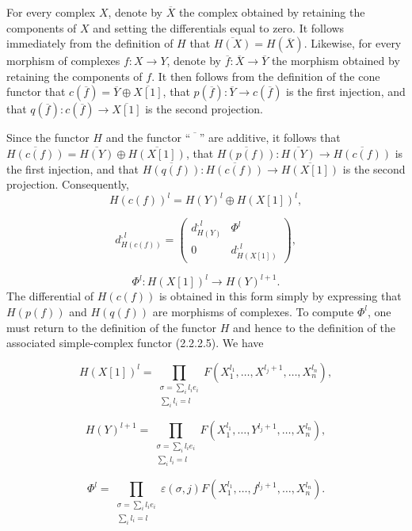 \clearpage
{}%
\begingroup
\small
\setlength{\abovedisplayskip}{3pt plus 2pt minus 2pt}%
\setlength{\belowdisplayskip}{3pt plus 2pt minus 2pt}%
\setlength{\jot}{2pt}%

For every complex $X$, denote by $\overline{X}$ the complex obtained by
retaining the components of $X$ and setting the differentials equal to zero.
It follows immediately from the definition of $H$ that
$\overline{H(X)}=H(\overline{X})$. Likewise, for every morphism of complexes
$f\colon X\longrightarrow Y$, denote by
$\overline{f}\colon\overline{X}\longrightarrow\overline{Y}$ the morphism
obtained by retaining the components of $f$. It then follows from the
definition of the cone functor that
$c(\overline{f})=\overline{Y}\oplus\overline{X[1]}$, that
$p(\overline{f})\colon\overline{Y}\longrightarrow c(\overline{f})$ is the
first injection, and that
$q(\overline{f})\colon c(\overline{f})\longrightarrow\overline{X[1]}$ is the
second projection.

Since the functor $H$ and the functor ``$\overline{\phantom{X}}$'' are
additive, it follows that
$\overline{H(c(f))}=\overline{H(Y)}\oplus\overline{H(X[1])}$, that
$\overline{H(p(f))}\colon\overline{H(Y)}\longrightarrow\overline{H(c(f))}$ is
the first injection, and that
$\overline{H(q(f))}\colon\overline{H(c(f))}\longrightarrow\overline{H(X[1])}$
is the second projection. Consequently,
\[
  H(c(f))^l=H(Y)^l\oplus H(X[1])^l,
\]

\begin{equation}
  d_{H(c(f))}^{,l}=
  \begin{pmatrix}
    d_{H(Y)}^{,l} & \Phi^l\\
    0 & d_{H(X[1])}^{,l}
  \end{pmatrix},
  \tag{3.4.3.2}
\end{equation}

\[
  \Phi^l\colon H(X[1])^l\longrightarrow H(Y)^{l+1}.
\]
The differential of $H(c(f))$ is obtained in this form simply by expressing
that $H(p(f))$ and $H(q(f))$ are morphisms of complexes. To compute $\Phi^l$,
one must return to the definition of the functor $H$ and hence to the
definition of the associated simple-complex functor (2.2.2.5). We have

\[
  H(X[1])^l=
  \prod_{\substack{\sigma=\sum_i l_i e_i\\ \sum_i l_i=l}}
  F(X_1^{l_1},\ldots,X^{l_j+1},\ldots,X_n^{l_n}),
\]

\begin{equation}
  H(Y)^{l+1}=
  \prod_{\substack{\sigma=\sum_i l_i e_i\\ \sum_i l_i=l}}
  F(X_1^{l_1},\ldots,Y^{l_j+1},\ldots,X_n^{l_n}),
  \tag{3.4.3.3}
\end{equation}

\[
  \Phi^l=
  \prod_{\substack{\sigma=\sum_i l_i e_i\\ \sum_i l_i=l}}
  \varepsilon(\sigma,j)
  F(X_1^{l_1},\ldots,f^{l_j+1},\ldots,X_n^{l_n}).
\]
\endgroup
